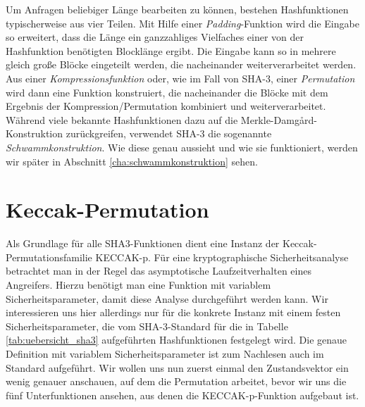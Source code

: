 Um Anfragen beliebiger Länge bearbeiten zu können, bestehen Hashfunktionen typischerweise aus vier Teilen. Mit Hilfe einer \textit{Padding}-Funktion wird die Eingabe so erweitert,
dass die Länge ein ganzzahliges Vielfaches einer von der Hashfunktion benötigten Blocklänge ergibt. Die Eingabe kann so in mehrere gleich große Blöcke eingeteilt werden,
die nacheinander weiterverarbeitet werden. Aus einer \textit{Kompressionsfunktion} oder, wie im Fall von SHA-3, einer \textit{Permutation} wird dann eine Funktion konstruiert,
die nacheinander die Blöcke mit dem Ergebnis der Kompression/Permutation kombiniert und weiterverarbeitet. Während viele bekannte Hashfunktionen dazu auf
die Merkle-Damg\r{a}rd-Konstruktion zurückgreifen, verwendet SHA-3 die sogenannte \textit{Schwammkonstruktion}.
Wie diese genau aussieht und wie sie funktioniert, werden wir später in Abschnitt \ref{cha:schwammkonstruktion} sehen.

\newcommand{\bigcomp}{%
  \DOTSB
  \mathop{\vphantom{\sum}\mathpalette\bigcomp@\relax}%
  \slimits@
}
\newcommand{\bigcomp@}[2]{%
  \begingroup\m@th
  \sbox\z@{$#1\sum$}%
  \setlength{\unitlength}{0.9\dimexpr\ht\z@+\dp\z@}%
  \vcenter{\hbox{%
    \begin{picture}(1,1)
    \bigcomp@linethickness{#1}
    \put(0.5,0.5){\circle{1}}
    \end{picture}%
  }}%
  \endgroup
}
\newcommand{\bigcomp@linethickness}[1]{%
  \linethickness{%
      \ifx#1\displaystyle 2\fontdimen8\textfont\else
      \ifx#1\textstyle 1.65\fontdimen8\textfont\else
      \ifx#1\scriptstyle 1.65\fontdimen8\scriptfont\else
      1.65\fontdimen8\scriptscriptfont\fi\fi\fi 3
  }%
}

\section{Keccak-Permutation}
Als Grundlage für alle SHA3-Funktionen dient eine Instanz der Keccak-Permutationsfamilie KECCAK-p.
Für eine kryptographische Sicherheitsanalyse betrachtet man in der Regel das asymptotische Laufzeitverhalten eines Angreifers.
Hierzu benötigt man eine Funktion mit variablem Sicherheitsparameter, damit diese Analyse durchgeführt werden kann.
Wir interessieren uns hier allerdings nur für die konkrete Instanz mit einem festen Sicherheitsparameter, die vom SHA-3-Standard \cite{sha3-standard}
für die in Tabelle \ref{tab:uebersicht_sha3} aufgeführten Hashfunktionen festgelegt wird.
Die genaue Definition mit variablem Sicherheitsparameter ist zum Nachlesen auch im Standard \cite{sha3-standard} aufgeführt.
Wir wollen uns nun zuerst einmal den Zustandsvektor ein wenig genauer anschauen, auf dem die Permutation arbeitet,
bevor wir uns die fünf Unterfunktionen ansehen, aus denen die KECCAK-p-Funktion aufgebaut ist.

